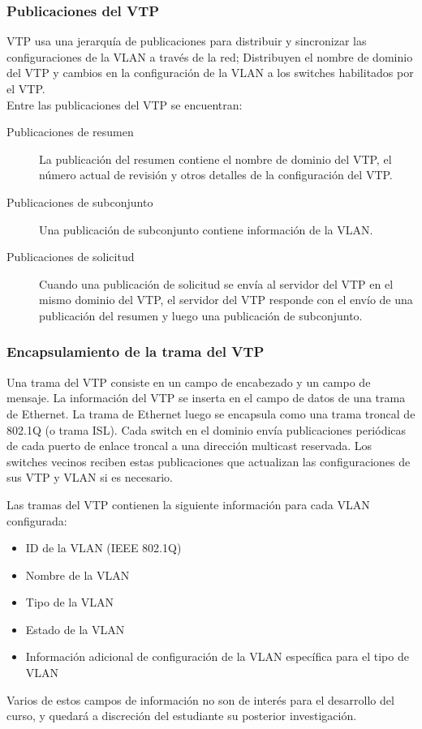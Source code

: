 \documentclass[12pt]{article}
\begin{document}
  \subsubsection{Publicaciones del VTP}
VTP usa una jerarquía de publicaciones para distribuir y sincronizar las configuraciones de la VLAN a través de la red; Distribuyen el nombre de dominio del VTP y cambios en la 
configuración de la VLAN a los switches habilitados por 
el VTP.\\

Entre las publicaciones del VTP se encuentran:
\begin{description}
\item[Publicaciones de resumen]{La publicación del resumen contiene el nombre de dominio del 
VTP, el número actual de revisión y otros detalles de la 
configuración del VTP.}
\item[Publicaciones de subconjunto]{Una publicación de subconjunto contiene información de la VLAN.}
\item[Publicaciones de solicitud]{Cuando una publicación de solicitud se envía al servidor del VTP 
en el mismo dominio del VTP, el servidor del VTP responde con el 
envío de una publicación del resumen y luego una publicación de 
subconjunto.}
\end{description}

\subsubsection{Encapsulamiento de la trama del VTP}
Una trama del VTP consiste en un campo de encabezado y un 
campo de mensaje. La información del VTP se inserta en el 
campo de datos de una trama de Ethernet. La trama de Ethernet 
luego se encapsula como una trama troncal de 802.1Q (o trama 
ISL). Cada switch en el dominio envía publicaciones periódicas de 
cada puerto de enlace troncal a una dirección multicast reservada.
Los switches vecinos reciben estas publicaciones que actualizan 
las configuraciones de sus VTP y VLAN si es necesario.

Las tramas del VTP contienen la siguiente información para 
cada VLAN configurada: 
\begin{itemize}
    \item ID de la VLAN (IEEE 802.1Q)
    \item Nombre de la VLAN
    \item Tipo de la VLAN
    \item Estado de la VLAN
    \item Información adicional de configuración de la VLAN específica para el tipo de VLAN 
\end{itemize}
Varios de estos campos de información no son de interés para el desarrollo del curso, y quedará a discreción del estudiante su posterior investigación.
\end{document}
